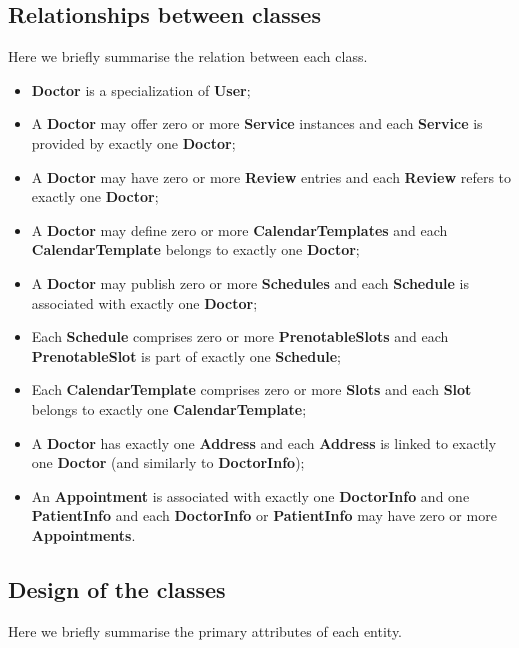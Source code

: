 \newpage

\subsection{Relationships between classes}
Here we briefly summarise the relation between each class.
\begin{itemize}
	\item \textbf{Doctor} is a specialization of \textbf{User};
	\item A \textbf{Doctor} may offer zero or more \textbf{Service} instances and each \textbf{Service} is provided by exactly one \textbf{Doctor};
	\item A \textbf{Doctor} may have zero or more \textbf{Review} entries and each \textbf{Review} refers to exactly one \textbf{Doctor}; 
	\item A \textbf{Doctor} may define zero or more \textbf{CalendarTemplates} and each \textbf{CalendarTemplate} belongs to exactly one \textbf{Doctor};
	\item A \textbf{Doctor} may publish zero or more \textbf{Schedules} and each \textbf{Schedule} is associated with exactly one \textbf{Doctor};
	\item Each \textbf{Schedule} comprises zero or more \textbf{PrenotableSlots} and each \textbf{PrenotableSlot} is part of exactly one \textbf{Schedule};
	\item Each \textbf{CalendarTemplate} comprises zero or more \textbf{Slots} and each \textbf{Slot} belongs to exactly one \textbf{CalendarTemplate}; 
	\item A \textbf{Doctor} has exactly one \textbf{Address} and each \textbf{Address} is linked to exactly one \textbf{Doctor} (and similarly to \textbf{DoctorInfo}); 
	\item An \textbf{Appointment} is associated with exactly one \textbf{DoctorInfo} and one \textbf{PatientInfo} and each \textbf{DoctorInfo} or \textbf{PatientInfo} may have zero or more \textbf{Appointments}. 
\end{itemize}

\subsection{Design of the classes}
Here we briefly summarise the primary attributes of each entity.

